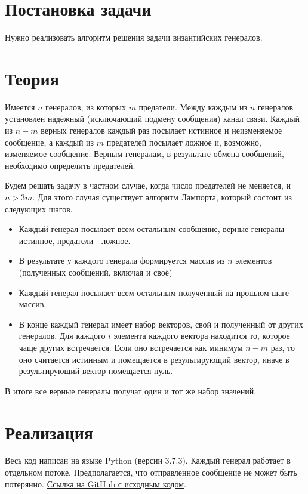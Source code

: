 \documentclass[a4paper,12pt]{article}
\begin{document}
    
    \newpage

    \tableofcontents
    \listoffigures
    \newpage

    \section{Постановка задачи}
    \quad Нужно реализовать алгоритм решения задачи византийских генералов.

    \section{Теория}
    \quad Имеется $ n $ генералов, из которых $ m $ предатели.
    Между каждым из $ n $ генералов установлен надёжный (исключающий подмену сообщения) канал связи.
    Каждый из $ n - m $ верных генералов каждый раз посылает истинное и неизменяемое сообщение,
    а каждый из $ m $ предателей посылает ложное и, возможно, изменяемое сообщение.
    Верным генералам, в результате обмена сообщений, необходимо определить предателей.

    Будем решать задачу в частном случае, когда число предателей не меняется, и $ n > 3m $.
    Для этого случая существует алгоритм Лампорта, который состоит из следующих шагов.

    \begin{itemize}
        \item Каждый генерал посылает всем остальным сообщение, верные генералы - истинное, предатели - ложное.
        \item В результате у каждого генерала формируется массив из $ n $ элементов (полученных сообщений, включая и своё)
        \item Каждый генерал посылает всем остальным полученный на прошлом шаге массив.
        \item В конце каждый генерал имеет набор векторов, свой и полученный от других генералов.
        Для каждого $ i $ элемента каждого вектора находится то, которое чаще других встречается.
        Если оно встречается как минимум $ n - m $ раз, то оно считается истинным и помещается в результирующий вектор,
        иначе в результирующий вектор помещается нуль. 
    \end{itemize}

    В итоге все верные генералы получат один и тот же набор значений.

    \section{Реализация}
    \quad Весь код написан на языке Python (версии 3.7.3).
    Каждый генерал работает в отдельном потоке.
    Предполагается, что отправленное сообщение не может быть потерянно.
    \href{https://github.com/kirillkuks/Networks/tree/master/lab3}{Ссылка на GitHub с исходным кодом}.
\end{document}
